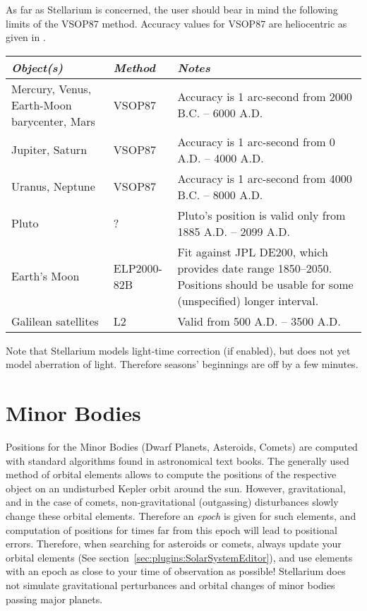 As far as Stellarium is concerned, the user should bear in mind the
following limits of the VSOP87 method. Accuracy values for VSOP87 are
heliocentric as given in \cite{1988A&A...202..309B}.

\begin{longtabu} to \textwidth {X|l|X}
\toprule
\emph{Object(s)} & \emph{Method} & \emph{Notes}\tabularnewline
\midrule
Mercury, Venus, Earth-Moon barycenter, Mars & VSOP87 & Accuracy is 1 arc-second from 2000 B.C. -- 6000 A.D. \\\midrule
Jupiter, Saturn                             & VSOP87 & Accuracy is 1 arc-second from 0 A.D. -- 4000 A.D.    \\\midrule
Uranus, Neptune                             & VSOP87 & Accuracy is 1 arc-second from 4000 B.C. -- 8000 A.D. \\\midrule
Pluto                                       & ?      & Pluto's position is valid only from 1885 A.D. -- 2099 A.D.\\\midrule
Earth's Moon                                & ELP2000-82B & Fit against JPL DE200, which provides date range 1850--2050. 
                                                            Positions should be usable for some (unspecified) longer interval. \\\midrule
Galilean satellites                         & L2     & Valid from 500 A.D. -- 3500 A.D.\\ %
\bottomrule
\end{longtabu}

\noindent Note that Stellarium models light-time correction (if enabled), but does not yet model aberration of light. 
Therefore seasons' beginnings are off by a few minutes.

\section{Minor Bodies}
\label{sec:Accuracy:MinorBodies}

Positions for the Minor Bodies (Dwarf Planets, Asteroids, Comets) are
computed with standard algorithms found in astronomical text
books. The generally used method of orbital elements allows to compute
the positions of the respective object on an undisturbed Kepler orbit
around the sun. However, gravitational, and in the case of comets,
non-gravitational (outgassing) disturbances slowly change these
orbital elements. Therefore an \emph{epoch} is given for such
elements, and computation of positions for times far from this epoch
will lead to positional errors. Therefore, when searching for
asteroids or comets, always update your orbital elements (See section~\ref{sec:plugins:SolarSystemEditor}), 
and use elements with an epoch as close to your time of observation as
possible! Stellarium does not simulate gravitational perturbances and
orbital changes of minor bodies passing major planets.

